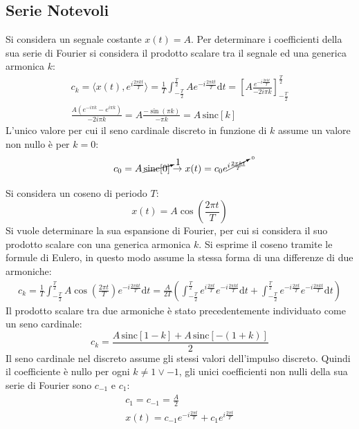 \documentclass{article}
\newcommand{\sinc}{\mathrm{sinc}}
\newcommand{\df}{\mathrm{d}}
\numberwithin{equation}{subsection}
\begin{document}
\subsection{Serie Notevoli}

Si considera un segnale costante $x(t)=A$. Per determinare i coefficienti della sua serie di Fourier si considera il prodotto scalare tra il segnale ed una generica armonica $k$: 
\begin{gather*}
    c_k=\langle x(t),e^{i\frac{2\pi kt}{T}}\rangle=\displaystyle\frac{1}{T}\int_{-\frac{T}{2}}^{\frac{T}{2}}Ae^{-i\frac{2\pi kt}{T}}\df t=\left[A\frac{e^{-i\frac{2\pi kt}{T}}}{-2i\pi k}\right]_{-\frac{T}{2}}^{\frac{T}{2}}\\
    \displaystyle\frac{A(e^{-i\pi k}-e^{i\pi k})}{-2i\pi k}=A\frac{-\sin(\pi k)}{-\pi k}=A\,\sinc[k]
\end{gather*}
L'unico valore per cui il seno cardinale discreto in funzione di $k$ assume un valore non nullo è per $k=0$:
\begin{equation*}
    c_0=A\,\cancelto{1}{\sinc[0]}\to x(t)=c_0e^{\cancelto{0}{i\frac{2\pi kt}{T}}}
\end{equation*}

Si considera un coseno di periodo $T$:
\begin{equation}
    x(t)=A\cos\left(\displaystyle\frac{2\pi t}{T}\right)
\end{equation}
Si vuole determinare la sua espansione di Fourier, per cui si considera il suo prodotto 
scalare con una generica armonica $k$. Si esprime il coseno tramite le formule di Eulero, in questo modo assume la stessa forma di una differenze di due armoniche: 
\begin{gather*}
    c_k=\displaystyle\frac{1}{T}\int_{-\frac{T}{2}}^{\frac{T}{2}}A\cos\left(\frac{2\pi t}{T}\right)e^{-i\frac{2\pi kt}{T}}\df t=
    \frac{A}{2T}\left(\int_{-\frac{T}{2}}^{\frac{T}{2}}e^{i\frac{2\pi t}{T}}e^{-i\frac{2\pi kt}{T}}\df t+\int_{-\frac{T}{2}}^{\frac{T}{2}}e^{-i\frac{2\pi t}{T}}e^{-i\frac{2\pi kt}{T}}\df t\right)
\end{gather*}
Il prodotto scalare tra due armoniche è stato precedentemente individuato come un seno cardinale:
\begin{equation*}
    \displaystyle c_k=\frac{A\,\sinc[1-k]+A\,\sinc[-(1+k)]}{2}
\end{equation*}
Il seno cardinale nel discreto assume gli stessi valori dell'impulso discreto. 
Quindi il coefficiente è nullo per ogni $k\neq1\lor-1$, gli unici coefficienti non nulli della sua serie di Fourier sono $c_{-1}$ e $c_1$:
\begin{gather*}
    \displaystyle c_1=c_{-1}=\frac{A}{2}\\
    \displaystyle x(t)=c_{-1}e^{-i\frac{2\pi t}{T}}+c_1e^{i\frac{2\pi t}{T}}
\end{gather*}
\end{document}
